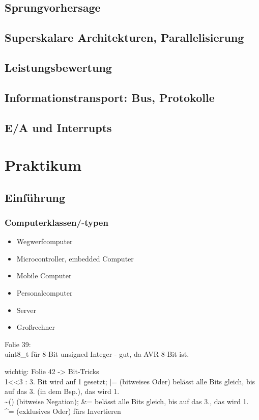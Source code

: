 \chapter{Sprungvorhersage}

\chapter{Superskalare Architekturen, Parallelisierung}

\chapter{Leistungsbewertung}

\chapter{Informationstransport: Bus, Protokolle}

\chapter{E/A und Interrupts}

\part{Praktikum}

\chapter{Einführung}

\section{Computerklassen/-typen}
\begin{itemize}
\item Wegwerfcomputer
\item Microcontroller, embedded Computer
\item Mobile Computer
\item Personalcomputer
\item Server
\item Großrechner
\end{itemize}


Folie 39: \\
uint8\_t für 8-Bit unsigned Integer - gut, da AVR 8-Bit ist.

wichtig: Folie 42 -> Bit-Tricks\\
1<<3 : 3. Bit wird auf 1 gesetzt; |= (bitweises Oder) belässt alle Bits gleich, bis auf das 3. (in dem Bsp.), das wird 1.\\
\textasciitilde() (bitweise Negation); \&= belässt alle Bits gleich, bis auf das 3., das wird 1.\\
\^{}= (exklusives Oder) fürs Invertieren



